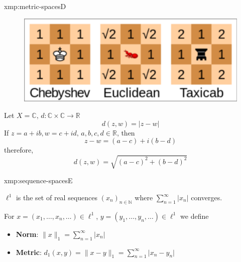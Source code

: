 \documentclass[landscape, 8pt]{extarticle}
\begin{document}
\begin{multicols}{3}
\begin{xmp}{xmp:metric-spaces}{D}
    \begin{figure}[H]
        \centering
        \includegraphics[width=0.8\linewidth]{images/2024-05-14-225838_hyprshot.png}
    \end{figure}




    Let $X = \mathbb{C},\, d: \mathbb{C} \times \mathbb{C} \to \mathbb{R} $
    \[d(z,w) = \lvert z - w \rvert\]
    If $z = a+ib, w = c+id,\, a,b,c,d\in\mathbb{R}$, then
    \[z - w = (a - c) + i(b - d)\]
    therefore,
    \[d(z,w) = \sqrt{(a-c)^{2} + (b-d)^{2}}\]

\end{xmp}



\begin{xmp}{xmp:sequence-spaces}{E}
    \vspace{-5pt}

    $\ell^{1}$ is the set of real sequences $(x_{n})_{n\in\mathbb{N}}$ where $\sum_{n = 1}^{\infty}\lvert x_{n} \rvert$ converges.

    For $x = (x_{1},\dots,x_{n},\dots)\in \ell^{1}$, $y = (y_{1},\dots,y_{n},\dots)\in \ell^{1}$ we define
    \vspace{-2pt}
    \begin{itemize}[leftmargin=*]
        \item \textbf{Norm}: $\lVert x \rVert_{1} = \sum_{n = 1}^{\infty} \lvert x_{n} \rvert$
        \item \textbf{Metric}: $d_{1}(x, y) = \lVert x - y \rVert_{1} = \sum_{n = 1}^{\infty} \lvert x_{n} - y_{n} \rvert$
    \end{itemize}
        
    \vspace{-2pt}


\end{xmp}
\end{multicols}
\end{document}
